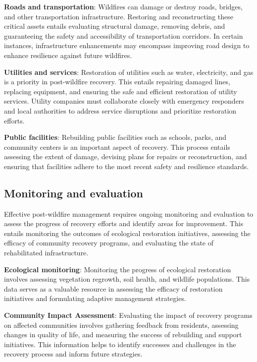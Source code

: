 \documentclass[
  12 pt,
]{Nemilov}
\begin{document}
\textbf{Roads and transportation}: Wildfires can damage or destroy roads, bridges, and other transportation infrastructure. Restoring and reconstructing these critical assets entails evaluating structural damage, removing debris, and guaranteeing the safety and accessibility of transportation corridors. In certain instances, infrastructure enhancements may encompass improving road design to enhance resilience against future wildfires.

\textbf{Utilities and services}: Restoration of utilities such as water, electricity, and gas is a priority in post-wildfire recovery. This entails repairing damaged lines, replacing equipment, and ensuring the safe and efficient restoration of utility services. Utility companies must collaborate closely with emergency responders and local authorities to address service disruptions and prioritize restoration efforts.

\textbf{Public facilities}: Rebuilding public facilities such as schools, parks, and community centers is an important aspect of recovery. This process entails assessing the extent of damage, devising plans for repairs or reconstruction, and ensuring that facilities adhere to the most recent safety and resilience standards.

\subsection{Monitoring and evaluation}\label{monitoring-and-evaluation}

Effective post-wildfire management requires ongoing monitoring and evaluation to assess the progress of recovery efforts and identify areas for improvement. This entails monitoring the outcomes of ecological restoration initiatives, assessing the efficacy of community recovery programs, and evaluating the state of rehabilitated infrastructure.

\textbf{Ecological monitoring}: Monitoring the progress of ecological restoration involves assessing vegetation regrowth, soil health, and wildlife populations. This data serves as a valuable resource in assessing the efficacy of restoration initiatives and formulating adaptive management strategies.

\textbf{Community Impact Assessment}: Evaluating the impact of recovery programs on affected communities involves gathering feedback from residents, assessing changes in quality of life, and measuring the success of rebuilding and support initiatives. This information helps to identify successes and challenges in the recovery process and inform future strategies.
\end{document}
